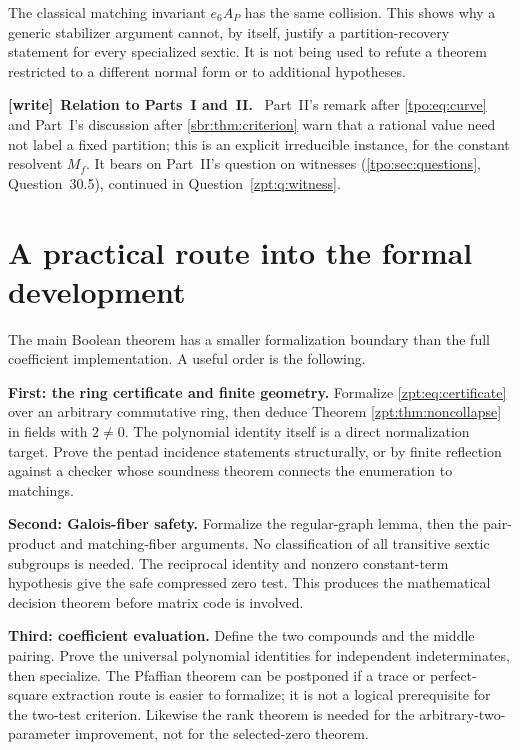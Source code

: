 \documentclass[11pt,letterpaper]{article}
\numberwithin{equation}{section}
\theoremstyle{definition}
\theoremstyle{remark}
\newenvironment{writenote}[1][]{\par\smallskip\begingroup\small
 \noindent\textbf{[write]}\if\relax\detokenize{#1}\relax\else~\textbf{#1.}\fi\ }%
 {\par\endgroup\smallskip}
\begin{document}
The classical matching invariant $e_6A_P$ has the same collision. This
shows why a generic stabilizer argument cannot, by itself, justify a
partition-recovery statement for every specialized sextic. It is not
being used to refute a theorem restricted to a different normal form or
to additional hypotheses.

\begin{writenote}[Relation to Parts~I and~II]
Part~II's remark after \eqref{tpo:eq:curve} and Part~I's discussion after
\cref{sbr:thm:criterion} warn that a rational value need not label a fixed
partition; this is an explicit irreducible instance, for the constant
resolvent $M_f$. It bears on Part~II's question on witnesses
(\cref{tpo:sec:questions}, Question~30.5), continued in
Question~\ref{zpt:q:witness}.
\end{writenote}

\section{A practical route into the formal development}
\label{zpt:sec:formalization}
The main Boolean theorem has a smaller formalization boundary than the
full coefficient implementation. A useful order is the following.

\textbf{First: the ring certificate and finite geometry.} Formalize
\eqref{zpt:eq:certificate} over an arbitrary commutative ring, then deduce
Theorem \ref{zpt:thm:noncollapse} in fields with $2\ne0$. The polynomial
identity itself is a direct normalization target. Prove the pentad
incidence statements structurally, or by finite reflection against a
checker whose soundness theorem connects the enumeration to matchings.

\textbf{Second: Galois-fiber safety.} Formalize the regular-graph lemma,
then the pair-product and matching-fiber arguments. No classification of
all transitive sextic subgroups is needed. The reciprocal identity and
nonzero constant-term hypothesis give the safe compressed zero test.
This produces the mathematical decision theorem before matrix code is
involved.

\textbf{Third: coefficient evaluation.} Define the two compounds and the
middle pairing. Prove the universal polynomial identities for independent
indeterminates, then specialize. The Pfaffian theorem can be postponed if
a trace or perfect-square extraction route is easier to formalize; it is
not a logical prerequisite for the two-test criterion. Likewise the
rank theorem is needed for the arbitrary-two-parameter improvement,
not for the selected-zero theorem.
\end{document}
